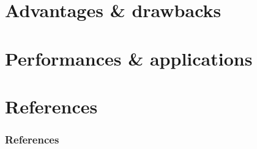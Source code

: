 \documentclass[10pt]{beamer}
\begin{document}
\section{Advantages \& drawbacks}

\section{Performances \& applications}

\section{References}

\begin{frame}[allowframebreaks]
\frametitle{References}
    
    
\end{frame}

\end{document}
